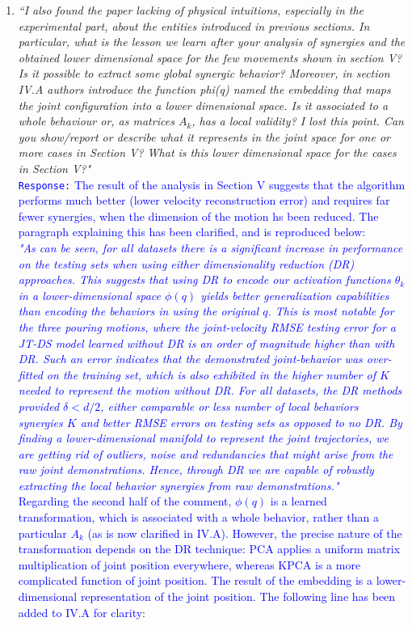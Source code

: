 \documentclass[10pt,stdletter,dateno]{newlfm}
\begin{document}
\begin{newlfm}
\begin{enumerate}
\item \textit{``I also found the paper lacking of physical intuitions, especially in	the experimental part, about the entities introduced in previous
	sections. In particular, what is the lesson we learn after your
	analysis of synergies and the obtained lower dimensional space for the
	few movements shown in section V? Is it possible to extract some global
	synergic behavior?
	Moreover, in section IV.A authors introduce the function phi(q) named
	the embedding that maps the joint configuration into a lower
	dimensional space. Is it associated to a whole behaviour or, as
	matrices $A_k$, has a local validity? I lost this point. Can you
	show/report or describe what it represents in the joint space for one
	or more cases in Section V? What is this lower dimensional space for
	the cases in Section V?"}\\
\textcolor{blue}{\texttt{Response:} \small The result of the analysis in Section V suggests that the algorithm performs much better (lower velocity reconstruction error) and requires far fewer synergies, when the dimension of the motion hs been reduced. The paragraph explaining this has been clarified, and is reproduced below:\\
\textit{"As can be seen, for all datasets there is a significant increase in performance on the testing sets when using either dimensionality reduction (DR) approaches. This suggests that using DR to encode our activation functions $\theta_k$ in a lower-dimensional space $\phi(q)$ yields better generalization capabilities than encoding the behaviors in using the original $q$. This is most notable for the three pouring motions, where the joint-velocity RMSE testing error for a JT-DS model learned without DR is an order of magnitude higher than with DR. Such an error indicates that the demonstrated joint-behavior was over-fitted on the training set, which is also exhibited in the higher number of $K$ needed to represent the motion without DR. For all datasets, the DR methods provided $\delta < d/2$, either comparable or less number of local behaviors synergies $K$ and better RMSE errors on testing sets as opposed to no DR. By finding a lower-dimensional manifold to represent the joint trajectories, we are getting rid of outliers, noise and redundancies that might arise from the raw joint demonstrations. Hence, through DR we are capable of robustly extracting the local behavior synergies from raw demonstrations."} \\
Regarding the second half of the comment, $\phi(q)$ is a learned transformation, which is associated with a whole behavior, rather than a particular $A_k$ (as is now clarified in IV.A). However, the precise nature of the transformation depends on the DR technique: PCA applies a uniform matrix multiplication of joint position everywhere, whereas KPCA is a more complicated function of joint position. The result of the embedding is a lower-dimensional representation of the joint position. The following line has been added to IV.A for clarity:\\
}
\end{enumerate}
\end{newlfm}
\end{document}
